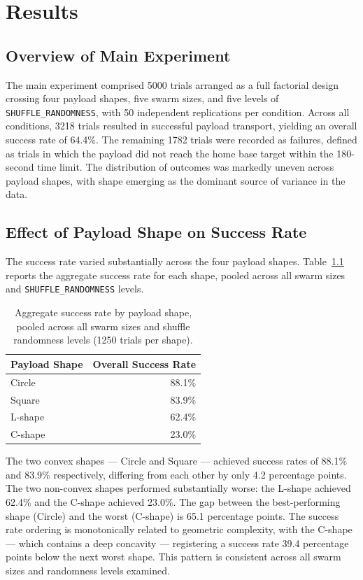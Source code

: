 \chapter{Results}
\label{ch:results}

\section{Overview of Main Experiment}
\label{sec:results_overview}

The main experiment comprised 5000 trials arranged as a full factorial design crossing four payload shapes, five swarm sizes, and five levels of \texttt{SHUFFLE\_RANDOMNESS}, with 50 independent replications per condition. Across all conditions, 3218 trials resulted in successful payload transport, yielding an overall success rate of 64.4\%. The remaining 1782 trials were recorded as failures, defined as trials in which the payload did not reach the home base target within the 180-second time limit. The distribution of outcomes was markedly uneven across payload shapes, with shape emerging as the dominant source of variance in the data.

\section{Effect of Payload Shape on Success Rate}
\label{sec:results_shape}

The success rate varied substantially across the four payload shapes. Table~\ref{tab:shape_success} reports the aggregate success rate for each shape, pooled across all swarm sizes and \texttt{SHUFFLE\_RANDOMNESS} levels.

\begin{table}[H]
\centering
\caption{Aggregate success rate by payload shape, pooled across all swarm sizes and shuffle randomness levels (1250 trials per shape).}
\label{tab:shape_success}
\begin{tabular}{@{}lr@{}}
\toprule
\textbf{Payload Shape} & \textbf{Overall Success Rate} \\
\midrule
Circle  & 88.1\% \\
Square  & 83.9\% \\
L-shape & 62.4\% \\
C-shape & 23.0\% \\
\bottomrule
\end{tabular}
\end{table}

The two convex shapes — Circle and Square — achieved success rates of 88.1\% and 83.9\% respectively, differing from each other by only 4.2 percentage points. The two non-convex shapes performed substantially worse: the L-shape achieved 62.4\% and the C-shape achieved 23.0\%. The gap between the best-performing shape (Circle) and the worst (C-shape) is 65.1 percentage points. The success rate ordering is monotonically related to geometric complexity, with the C-shape — which contains a deep concavity — registering a success rate 39.4 percentage points below the next worst shape. This pattern is consistent across all swarm sizes and randomness levels examined.

